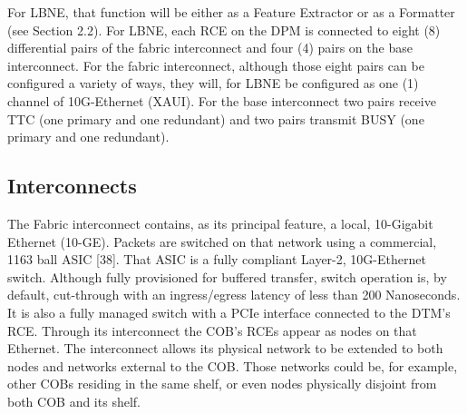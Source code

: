For LBNE, that function will be either as a Feature Extractor or as a Formatter (see Section 2.2).
For LBNE, each RCE on the DPM is connected to eight (8) differential pairs of the fabric interconnect and four (4) pairs on the base interconnect. For the fabric interconnect, although those eight pairs can be configured a variety of ways, they will, for LBNE be configured as one (1) channel of 10G-Ethernet (XAUI). For the base interconnect two pairs receive TTC (one primary and one redundant) and two pairs transmit BUSY (one primary and one redundant).

\subsection{Interconnects}

The Fabric interconnect contains, as its principal feature, a local, 10-Gigabit Ethernet (10-GE). Packets are switched on that network using a commercial, 1163 ball ASIC [38]. That ASIC is a fully compliant Layer-2, 10G-Ethernet switch. Although fully provisioned for buffered transfer, switch operation is, by default, cut-through with an ingress/egress latency of less than 200 Nanoseconds. It is also a fully managed switch with a PCIe interface connected to the DTM's RCE. Through its interconnect the COB's RCEs appear as nodes on that Ethernet. The interconnect allows its physical network to be extended to both nodes and networks external to the COB. Those networks could be, for example, other COBs residing in the same shelf, or even nodes physically disjoint from both COB and its shelf.

